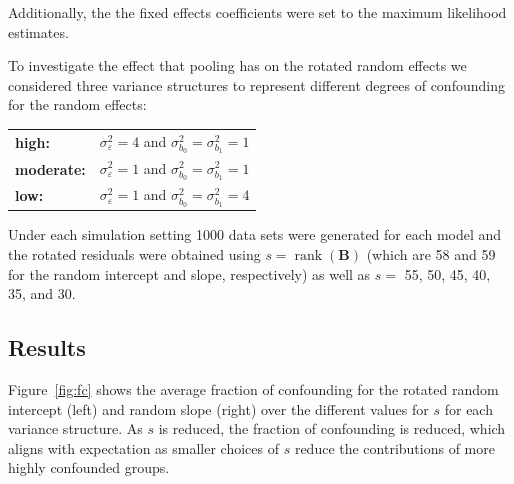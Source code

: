 \documentclass[12pt]{article} %
\DeclareMathOperator{\rank}{rank}
\begin{document}
Additionally, the the fixed effects coefficients were set to the maximum likelihood estimates.

To investigate the effect that pooling has on the rotated random effects we considered  three variance structures to represent different degrees of confounding for the random effects:\\
%
\begin{tabular}{ll}
\textbf{high:} & $\sigma^2_\varepsilon = 4$ and  $\sigma^2_{b_0} = \sigma^2_{b_1} = 1$ \\
\textbf{moderate:} & $\sigma^2_\varepsilon = 1$ and  $\sigma^2_{b_0} = \sigma^2_{b_1} = 1$ \\
\textbf{low:} & $\sigma^2_\varepsilon = 1$ and  $\sigma^2_{b_0} = \sigma^2_{b_1} = 4$ \\
\end{tabular}
%

Under each simulation setting 1000 data sets were generated for each model and the rotated residuals were obtained using $s = \rank(\bm{B})$ (which are 58 and 59 for the random intercept and slope, respectively) as well as $s =$ 55, 50, 45, 40, 35, and 30.


\subsection{Results}\label{sec:sim-results}

Figure~\ref{fig:fc} shows the average fraction of confounding for the rotated random intercept (left) and random slope (right) over the different values for $s$ for each variance structure. As $s$ is reduced, the fraction of confounding is reduced, which aligns with expectation as smaller choices of $s$ reduce the contributions of more highly confounded groups.
\end{document}
